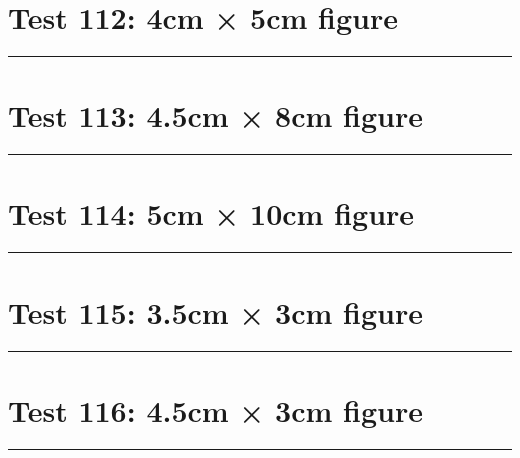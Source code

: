 \documentclass[a4paper,11pt]{article}
\begin{document}
\section*{Test 112: 4cm × 5cm figure}
\begin{swarmwrap}%
  \begin{minipage}[t]{4cm}
    \centering
    \rule{\linewidth}{5cm}
  \end{minipage}%
\end{swarmwrap}%
\swarmwrapnext
\lipsum[13]
\lipsum[14]
\lipsum[15]
\lipsum[16]
\lipsum[17]
\section*{Test 113: 4.5cm × 8cm figure}
\begin{swarmwrap}%
  \begin{minipage}[t]{4cm}
    \centering
    \rule{\linewidth}{8cm}
  \end{minipage}%
\end{swarmwrap}%
\swarmwrapnext
\lipsum[135]
\lipsum[136]
\lipsum[137]
\section*{Test 114: 5cm × 10cm figure}
\begin{swarmwrap}%
  \begin{minipage}[t]{5cm}
    \centering
    \rule{\linewidth}{10cm}
  \end{minipage}%
\end{swarmwrap}%
\swarmwrapnext
\lipsum[95]
\lipsum[96]
\lipsum[97]
\lipsum[98]
\section*{Test 115: 3.5cm × 3cm figure}
\begin{swarmwrap}%
  \begin{minipage}[t]{3cm}
    \centering
    \rule{\linewidth}{3cm}
  \end{minipage}%
\end{swarmwrap}%
\swarmwrapnext
\lipsum[82]
\lipsum[83]
\lipsum[84]
\lipsum[85]
\lipsum[86]
\section*{Test 116: 4.5cm × 3cm figure}
\begin{swarmwrap}%
  \begin{minipage}[t]{4cm}
    \centering
    \rule{\linewidth}{3cm}
  \end{minipage}%
\end{swarmwrap}%
\swarmwrapnext
\lipsum[131]
\lipsum[132]
\lipsum[133]
\lipsum[134]
\lipsum[135]
\end{document}
